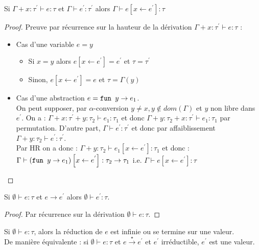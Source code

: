 \documentclass{cours}
\begin{document}
\begin{lemma}
    Si $\Gamma + x : \tau^{'} \vdash e : \tau$ et $\Gamma \vdash e^{'} : \tau^{'}$ alors $\Gamma \vdash e\left[x \leftarrow e^{'}\right] : \tau$
\end{lemma}
\begin{proof}
    Preuve par récurrence sur la hauteur de la dérivation $\Gamma + x : \tau^{'} \vdash e : \tau$ :
    \begin{itemize}
        \item Cas d'une variable $e = y$
              \begin{itemize}
                  \item Si $x = y$ alors $e\left[x \leftarrow e^{'}\right] = e^{'}$ et $\tau = \tau^{'}$
                  \item Sinon, $e\left[x \leftarrow e^{'}\right] = e$ et $\tau = \Gamma(y)$
              \end{itemize}
        \item Cas d'une abstraction $e = \texttt{fun } y \rightarrow e_{1}$.\\
              On peut supposer, par $\alpha$-conversion $y \neq x, y \notin dom\left(\Gamma\right)$ et $y$ non libre dans $e^{'}$. On a : $\Gamma + x : \tau^{'} + y : \tau_{2} \vdash e_{1} : \tau_{1}$ et donc $\Gamma + y : \tau_{2} + x : \tau^{'} \vdash e_{1} : \tau_{1}$ par permutation. D'autre part, $\Gamma \vdash e^{'} : \tau^{'}$ et donc par affaiblissement $\Gamma + y : \tau_{2} \vdash e^{'} : \tau^{'}$.\\
              Par HR on a donc : $\Gamma + y : \tau_{2} \vdash e_{1}\left[x \leftarrow e^{'}\right] : \tau_{1}$ et donc :$\Gamma \vdash \left(\texttt{fun } y \rightarrow e_{1}\right)\left[x \leftarrow e^{'}\right] : \tau_{2} \rightarrow \tau_{1}$ i.e. $\Gamma \vdash e\left[x \leftarrow e^{'}\right] : \tau$
    \end{itemize}
\end{proof}

\begin{lemma}[Préservation]
    Si $\emptyset \vdash e : \tau$ et $e \rightarrow e^{'}$ alors $\emptyset \vdash e^{'} : \tau$.
\end{lemma}
\begin{proof}
    Par récurrence sur la dérivation $\emptyset \vdash e : \tau$.
\end{proof}

\begin{theorem}
    Si $\emptyset \vdash e : \tau$, alors la réduction de $e$ est infinie ou se termine sur une valeur.\\
    De manière équivalente : si $\emptyset \vdash e : \tau$ et $e \xrightarrow{\star} e^{'}$ et $e^{'}$ irréductible, $e^{'}$ est une valeur.
\end{theorem}
\end{document}
